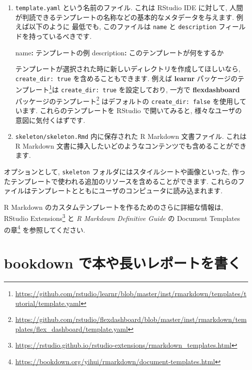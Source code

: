 \documentclass[
  11pt,
  lualatex,
  ja=standard]{bxjsreport}
\newenvironment{Shaded}{\begin{snugshade}}{\end{snugshade}}
\newcommand{\AttributeTok}[1]{\textcolor[rgb]{0.77,0.63,0.00}{#1}}
\newcommand{\FunctionTok}[1]{\textcolor[rgb]{0.00,0.00,0.00}{#1}}
\newcommand{\KeywordTok}[1]{\textcolor[rgb]{0.13,0.29,0.53}{\textbf{#1}}}
\renewcommand{\href}[2]{#2\footnote{\url{#1}}}
\begin{document}
\begin{enumerate}
\def\labelenumi{\arabic{enumi}.}
\item
  \texttt{template.yaml} という名前のファイル. これは RStudio IDE に対して, 人間が判読できるテンプレートの名称などの基本的なメタデータを与えます. 例えば以下のように 最低でも, このファイルは \texttt{name} と \texttt{description} フィールドを持っているべきです.

\begin{Shaded}
\begin{Highlighting}[]
\FunctionTok{name}\KeywordTok{:}\AttributeTok{ テンプレートの例}
\FunctionTok{description}\KeywordTok{:}\AttributeTok{ このテンプレートが何をするか}
\end{Highlighting}
\end{Shaded}

  テンプレートが選択された時に新しいディレクトリを作成してほしいなら, \texttt{create\_dir: true} を含めることもできます. 例えば \href{https://github.com/rstudio/learnr/blob/master/inst/rmarkdown/templates/tutorial/template.yaml}{\textbf{learnr} パッケージのテンプレート}は \texttt{create\_dir: true} を設定しており, 一方で \href{https://github.com/rstudio/flexdashboard/blob/master/inst/rmarkdown/templates/flex_dashboard/template.yaml}{\textbf{flexdashboard} パッケージのテンプレート} はデフォルトの \texttt{create\_dir: false} を使用しています. これらのテンプレートを RStudio で開いてみると, 様々なユーザの意図に気付くはずです.
\item
  \texttt{skeleton/skeleton.Rmd} 内に保存された R Markdown 文書ファイル. これは R Markdown 文書に挿入したいどのようなコンテンツでも含めることができます.
\end{enumerate}

オプションとして, \texttt{skeleton} フォルダにはスタイルシートや画像といった, 作ったテンプレートで使われる追加のリソースを含めることができます. これらのファイルはテンプレートとともにユーザのコンピュータに読み込まれます.

R Markdown のカスタムテンプレートを作るためのさらに詳細な情報は, \href{https://rstudio.github.io/rstudio-extensions/rmarkdown_templates.html}{RStudio Extensions} と \emph{R Markdown Definitive Guide} \autocite{rmarkdown2018} の \href{https://bookdown.org/yihui/rmarkdown/document-templates.html}{Document Templates の章} を参照してください.

\hypertarget{bookdown}{%
\section{\texorpdfstring{\textbf{bookdown} で本や長いレポートを書く}{bookdown で本や長いレポートを書く}}\label{bookdown}}
\end{document}
